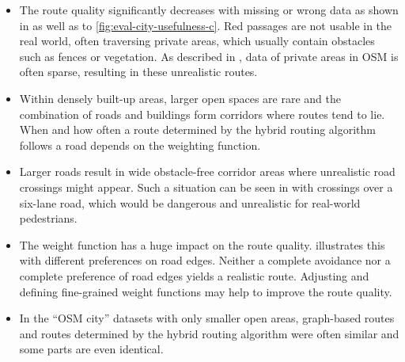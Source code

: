 			\begin{itemize}
				\item The route quality significantly decreases with missing or wrong data as shown in  as well as  to \ref{fig:eval-city-usefulness-c}.
				Red passages are not usable in the real world, often traversing private areas, which usually contain obstacles such as fences or vegetation.
				As described in , data of private areas in OSM is often sparse, resulting in these unrealistic routes.
				\item Within densely built-up areas, larger open spaces are rare and the combination of roads and buildings form corridors where routes tend to lie.
				When and how often a route determined by the hybrid routing algorithm follows a road depends on the weighting function.
				\item Larger roads result in wide obstacle-free corridor areas where unrealistic road crossings might appear.
				Such a situation can be seen in  with crossings over a six-lane road, which would be dangerous and unrealistic for real-world pedestrians.
				\item The weight function has a huge impact on the route quality.
				 illustrates this with different preferences on road edges.
				Neither a complete avoidance nor a complete preference of road edges yields a realistic route.
				Adjusting and defining fine-grained weight functions may help to improve the route quality.
				\item In the \enquote{OSM city} datasets with only smaller open areas, graph-based routes and routes determined by the hybrid routing algorithm were often similar and some parts are even identical.
			\end{itemize}
			
